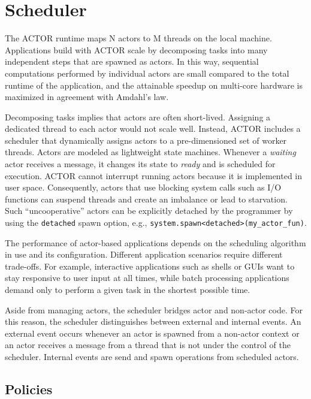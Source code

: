 \section{Scheduler}
\label{scheduler}

The ACTOR runtime maps N actors to M threads on the local machine. Applications
build with ACTOR scale by decomposing tasks into many independent steps that are
spawned as actors. In this way, sequential computations performed by individual
actors are small compared to the total runtime of the application, and the
attainable speedup on multi-core hardware is maximized in agreement with
Amdahl's law.

Decomposing tasks implies that actors are often short-lived. Assigning a
dedicated thread to each actor would not scale well. Instead, ACTOR includes a
scheduler that dynamically assigns actors to a pre-dimensioned set of worker
threads. Actors are modeled as lightweight state machines. Whenever a
\emph{waiting} actor receives a message, it changes its state to \emph{ready}
and is scheduled for execution. ACTOR cannot interrupt running actors because it
is implemented in user space. Consequently, actors that use blocking system
calls such as I/O functions can suspend threads and create an imbalance or lead
to starvation. Such ``uncooperative'' actors can be explicitly detached by the
programmer by using the \lstinline^detached^ spawn option, e.g.,
\lstinline^system.spawn<detached>(my_actor_fun)^.

The performance of actor-based applications depends on the scheduling algorithm
in use and its configuration. Different application scenarios require different
trade-offs. For example, interactive applications such as shells or GUIs want
to stay responsive to user input at all times, while batch processing
applications demand only to perform a given task in the shortest possible time.

Aside from managing actors, the scheduler bridges actor and non-actor code. For
this reason, the scheduler distinguishes between external and internal events.
An external event occurs whenever an actor is spawned from a non-actor context
or an actor receives a message from a thread that is not under the control of
the scheduler. Internal events are send and spawn operations from scheduled
actors.

\subsection{Policies}
\label{scheduler-policy}

